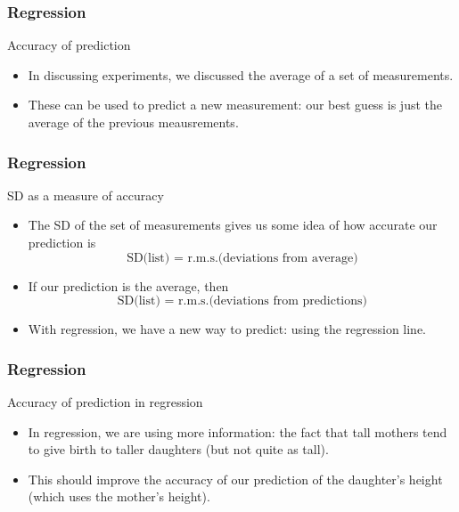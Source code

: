 \documentclass[handout]{beamer}
\begin{document}

   \begin{frame} \frametitle{Regression}

   \begin{block}
   {Accuracy of prediction}
   \begin{itemize}
   \item In discussing experiments, we discussed the
   average of a set of measurements.
   \item These can be used
   to predict a new measurement: our best guess is just
   the average of the previous meausrements.
   \end{itemize}
   \end{block}
   \end{frame}


   \begin{frame} \frametitle{Regression}

   \begin{block}
   {SD as a measure of accuracy}
   \begin{itemize}
   \item The SD of the set of measurements gives us some
   idea of how accurate our prediction is
   $$
   \text{SD(list) = r.m.s.(deviations from average)}
   $$
   \item If our prediction is the average, then
   $$
   \text{SD(list) = r.m.s.(deviations from predictions)}
   $$
   \item With regression, we have a new way
   to predict: using the regression line.
   \end{itemize}

   \end{block}
   \end{frame}


   \begin{frame} \frametitle{Regression}

   \begin{block}
   {Accuracy of prediction in regression}
   \begin{itemize}
   \item In regression, we are using more information:
   the fact that tall mothers tend to give birth to  taller
   daughters (but not quite as tall).
   \item This should improve the accuracy of our prediction
   of the daughter's height (which uses the mother's height).
   \end{itemize}
   \end{block}
   \end{frame}
\end{document}
